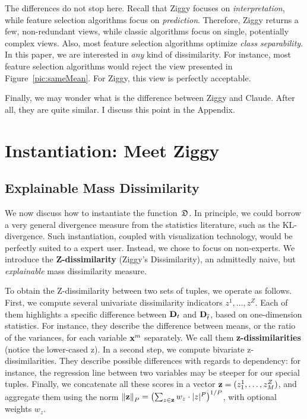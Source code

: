 The differences do not stop here. Recall that Ziggy focuses on
\emph{interpretation}, while feature selection algorithms focus on
\emph{prediction}. Therefore, Ziggy returns a few, non-redundant views, while
classic algorithms focus on single, potentially complex views. Also, most
feature selection algorithms optimize \emph{class separability}. In this paper,
we are interested in \emph{any} kind of dissimilarity. For instance, most
feature selection algorithms would reject the view presented
in Figure~\ref{pic:sameMean}. For Ziggy, this view is perfectly acceptable. 

Finally, we may wonder what is the difference between Ziggy and Claude. After
all, they are quite similar. I discuss this point in the Appendix.


\section{Instantiation: Meet Ziggy}
\label{sec:instantiation}

\subsection{Explainable Mass Dissimilarity}
\label{sec:explain}

We now discuss how to instantiate the function~$\mathfrak{D}$. In principle, we could
borrow a very general divergence measure from the statistics literature, such
as the KL-divergence.  Such instantiation, coupled with visualization
technology, would be perfectly suited to a expert user. Instead, we chose to
focus on non-experts. We introduce the \textbf{Z-dissimilarity} (Ziggy's
Dissimilarity), an admittedly naive, but \emph{explainable} mass dissimilarity
measure.

To obtain the Z-dissimilarity between two sets of tuples, we operate as
follows. First, we compute several univariate dissimilarity indicators $z^1,
\ldots, z^Z$.  Each of them highlights a specific difference between $\mathbf{D}_t$
and $\mathbf{D}_{\overline{t}}$, based on one-dimension statistics. For instance,
they describe the difference between means, or the ratio of the variances, for
each variable $\mathbf{x}^m$ separately.  We call them \textbf{z-dissimilarities}
(notice the lower-cased z). In a second step, we compute bivariate
z-dissimilarities. They describe possible differences with regards to
dependency: for instance, the regression line between two variables may be
steeper for our special tuples. Finally, we concatenate all these scores in a
vector $\mathbf{z}=(z^1_1, \ldots, z^Z_M)$, and aggregate them using the norm
$\left\lVert \mathbf{z} \right\rVert_P=\left(\sum_{z \in \mathbf{z}} w_z \cdot |z|^P \right)^{1/P}$, with
optional weights $w_z$.

